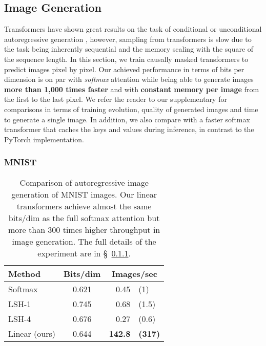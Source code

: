 \documentclass{article}
\begin{document}
\subsection{Image Generation} \label{sec:image}

Transformers
have shown great results on the task of conditional or unconditional
autoregressive generation \cite{radford2019language, child2019generating},
however, sampling from transformers is slow due to the task being inherently
sequential and the memory scaling with the square of the sequence length.
In this section, we train causally masked transformers to predict images
pixel by pixel. Our achieved performance in terms of bits
per dimension is on par with \emph{softmax} attention while being able to generate
images \textbf{more than 1,000 times faster} and with \textbf{constant memory
per image} from the first to the last pixel. We refer the reader to our
supplementary for comparisons in terms of training evolution, quality of
generated images and time to generate a single image. In addition, we also
compare with a faster softmax transformer that caches the keys and values
during inference, in contrast to the PyTorch implementation.

\subsubsection{MNIST} \label{sec:exp-mnist}

\bgroup
\renewcommand{\arraystretch}{1.1}
\begin{table}
    \begin{center}
    \begin{tabular}{lcrl}
        Method & Bits/dim & \multicolumn{2}{c}{Images/sec}\\
        \hline
        Softmax & 0.621 & 0.45 & (1) \\
        LSH-1 & 0.745 & 0.68 & (1.5) \\
        LSH-4 & 0.676 & 0.27 & (0.6) \\
        \hline
        Linear (ours) & 0.644 & \textbf{142.8} & \textbf{(317)}
    \end{tabular}
    \end{center}
    \caption{Comparison of autoregressive image generation of MNIST images. Our
             linear transformers achieve almost the same bits/dim as the full
             softmax attention but more than 300 times higher throughput in
             image generation. The full details of the experiment are in
             \S~\ref{sec:exp-mnist}.}
    \label{tab:mnist}
\end{table}
\egroup
\end{document}
